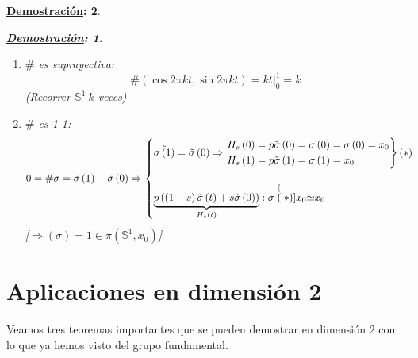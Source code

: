 \documentclass[10pt,a4paper,openright]{book}
\theoremstyle{break}
\newtheorem*{demo}{\underline{Demostración}:}
\begin{document}
\begin{demo}
\begin{demo}
\begin{enumerate}
        \item $\#$ es suprayectiva: 
        \[
        \# \left( \cos 2 \pi k t, \sin 2 \pi k t \right) = k t|_0^1 = k 
        \]
        (Recorrer $\mathbb{S}^{1}\ k$ veces)

        \item $\#$ es 1-1:
        \[
        0 = \# \sigma = \tilde{\sigma} \left( 1 \right) - \tilde{\sigma} \left( 0 \right) \Rightarrow \begin{cases}
            \tilde{\sigma\left( 1 \right)} = \tilde{\sigma} \left( 0 \right) \Rightarrow \begin{rcases}
                H_s\left( 0 \right) = p \tilde{\sigma} \left( 0 \right) = \sigma\left( 0 \right) = \sigma\left( 0 \right) = x_0\\
                H_s\left( 1 \right) = p \tilde{\sigma} \left( 1 \right) = \sigma\left( 1 \right) = x_0
            \end{rcases}(*)\\\\

            \underbrace{p\left( \left( 1 - s \right) \tilde{\sigma} \left( t \right) + s \tilde{\sigma} \left( 0 \right) \right)}_{H_s\left( t \right)} : \sigma \stackrel[(*)]{x_0}{\simeq} x_0 
        \end{cases} 
        \]
        [$\Rightarrow \left( \sigma \right) = 1 \in \pi \left( \mathbb{S}^{1}, x_0 \right)$]
    \end{enumerate}
\end{demo}
\end{demo}


\chapter{Aplicaciones en dimensión 2}%
\label{cha:aplicaciones_en_dimension_2_}
Veamos tres teoremas importantes que se pueden demostrar en dimensión $2$ con lo que ya hemos visto del grupo fundamental.
\end{document}
